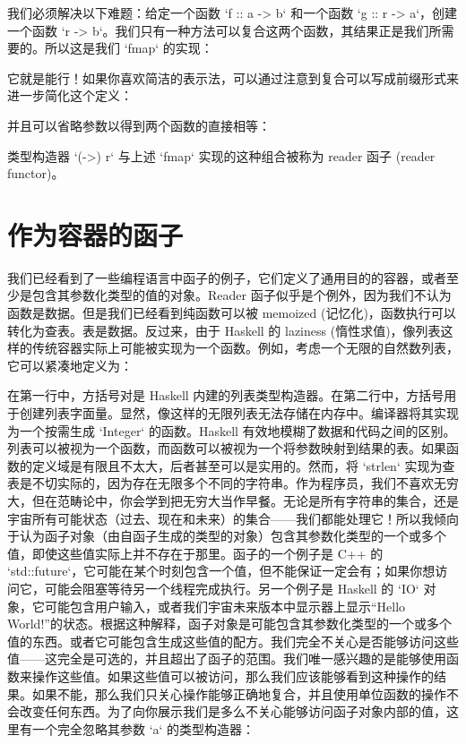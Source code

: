 我们必须解决以下难题：给定一个函数 `f :: a -> b` 和一个函数 `g :: r -> a`，创建一个函数 `r -> b`。我们只有一种方法可以复合这两个函数，其结果正是我们所需要的。所以这是我们 `fmap` 的实现：

它就是能行！如果你喜欢简洁的表示法，可以通过注意到复合可以写成前缀形式来进一步简化这个定义：

并且可以省略参数以得到两个函数的直接相等：

类型构造器 `(->) r` 与上述 `fmap` 实现的这种组合被称为 reader 函子 (reader functor)。

\section{作为容器的函子}

我们已经看到了一些编程语言中函子的例子，它们定义了通用目的的容器，或者至少是包含其参数化类型的值的对象。Reader 函子似乎是个例外，因为我们不认为函数是数据。但是我们已经看到纯函数可以被 memoized (记忆化)，函数执行可以转化为查表。表是数据。反过来，由于 Haskell 的 laziness (惰性求值)，像列表这样的传统容器实际上可能被实现为一个函数。例如，考虑一个无限的自然数列表，它可以紧凑地定义为：

在第一行中，方括号对是 Haskell 内建的列表类型构造器。在第二行中，方括号用于创建列表字面量。显然，像这样的无限列表无法存储在内存中。编译器将其实现为一个按需生成 `Integer` 的函数。Haskell 有效地模糊了数据和代码之间的区别。列表可以被视为一个函数，而函数可以被视为一个将参数映射到结果的表。如果函数的定义域是有限且不太大，后者甚至可以是实用的。然而，将 `strlen` 实现为查表是不切实际的，因为存在无限多个不同的字符串。作为程序员，我们不喜欢无穷大，但在范畴论中，你会学到把无穷大当作早餐。无论是所有字符串的集合，还是宇宙所有可能状态（过去、现在和未来）的集合——我们都能处理它！所以我倾向于认为函子对象（由自函子生成的类型的对象）包含其参数化类型的一个或多个值，即使这些值实际上并不存在于那里。函子的一个例子是 C++ 的 `std::future`，它可能在某个时刻包含一个值，但不能保证一定会有；如果你想访问它，可能会阻塞等待另一个线程完成执行。另一个例子是 Haskell 的 `IO` 对象，它可能包含用户输入，或者我们宇宙未来版本中显示器上显示“Hello World!”的状态。根据这种解释，函子对象是可能包含其参数化类型的一个或多个值的东西。或者它可能包含生成这些值的配方。我们完全不关心是否能够访问这些值——这完全是可选的，并且超出了函子的范围。我们唯一感兴趣的是能够使用函数来操作这些值。如果这些值可以被访问，那么我们应该能够看到这种操作的结果。如果不能，那么我们只关心操作能够正确地复合，并且使用单位函数的操作不会改变任何东西。为了向你展示我们是多么不关心能够访问函子对象内部的值，这里有一个完全忽略其参数 `a` 的类型构造器：

